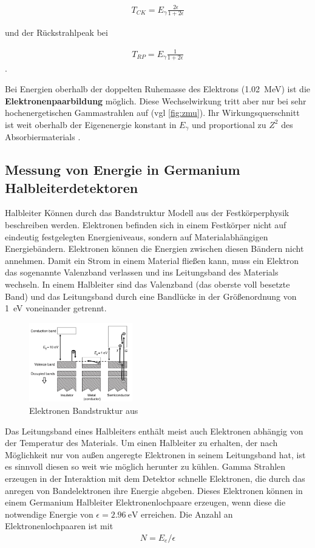 \begin{align}
	T_{CK}= E_\gamma \frac{2\epsilon}{1+2\epsilon}
	\label{eq:CK}
\end{align}

und der Rückstrahlpeak bei

\begin{align}
	T_{RP}= E_\gamma \frac{1}{1+2\epsilon}
	\label{eq:RP}
\end{align}.

Bei Energien oberhalb der doppelten Ruhemasse des Elektrons (\qty{1.02}{\MeV})
ist die \textbf{Elektronenpaarbildung} möglich. Diese Wechselwirkung tritt aber
nur bei sehr hochenergetischen Gammastrahlen auf (vgl \ref{fig:zmu}). Ihr
Wirkungsquerschnitt ist weit oberhalb der Eigenenergie konstant in $E_\gamma$
und proportional zu $Z^2$ des Absorbiermaterials \cite[vgl.][Kap
	3.5.5]{book:kolano}.

\subsection{Messung von Energie in Germanium Halbleiterdetektoren \cite{book:gil}}

Halbleiter Können durch das Bandstruktur Modell aus der Festkörperphysik
beschreiben werden. Elektronen befinden sich in einem Festkörper nicht auf
eindeutig festgelegten Energieniveaus, sondern auf Materialabhängigen
Energiebändern. Elektronen können die Energien zwischen diesen Bändern nicht
annehmen. Damit ein Strom in einem Material fließen kann, muss ein Elektron das
sogenannte Valenzband verlassen und ins Leitungsband des Materials wechseln. In
einem Halbleiter sind das Valenzband (das oberste voll besetzte Band) und das
Leitungsband durch eine Bandlücke in der Größenordnung von \qty{1}{\eV}
voneinander getrennt.
\begin{figure}
	\centering
	\includegraphics[width=0.4\textwidth]{./Bilder/ElectronBandsGilmore.png}
	\caption{Elektronen Bandstruktur aus \cite{book:gil}}\label{fig:eband}
\end{figure}
Das Leitungsband eines Halbleiters enthält meist auch Elektronen abhängig von
der Temperatur des Materials.
Um einen Halbleiter zu erhalten, der nach Möglichkeit nur von außen angeregte
Elektronen in seinem Leitungsband hat, ist es sinnvoll diesen so weit wie
möglich herunter zu kühlen. Gamma Strahlen erzeugen in der Interaktion mit dem
Detektor schnelle Elektronen, die durch das anregen von Bandelektronen ihre
Energie abgeben. Dieses Elektronen können in einem Germanium Halbleiter
Elektronenlochpaare erzeugen, wenn diese die notwendige Energie von $\epsilon =
	\qty{2.96}{\eV}$ erreichen. Die Anzahl an Elektronenlochpaaren ist mit
\begin{align}
	N = E_e / \epsilon
\end{align}


